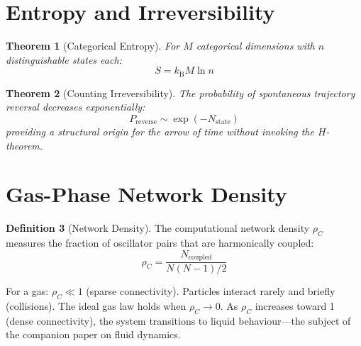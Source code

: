 \documentclass[twocolumn,10pt,a4paper]{article}
\theoremstyle{plain}
\newtheorem{theorem}{Theorem}[section]
\theoremstyle{definition}
\newtheorem{definition}[theorem]{Definition}
\theoremstyle{remark}
\newcommand{\kB}{k_{\mathrm{B}}}
\begin{document}
\section{Entropy and Irreversibility}
\label{sec:entropy}

\begin{theorem}[Categorical Entropy]
For $M$ categorical dimensions with $n$ distinguishable states each:
\begin{equation}
    S = \kB M \ln n
\end{equation}
\end{theorem}

\begin{theorem}[Counting Irreversibility]
The probability of spontaneous trajectory reversal decreases exponentially:
\begin{equation}
    P_{\mathrm{reverse}} \sim \exp(-N_{\mathrm{state}})
\end{equation}
providing a structural origin for the arrow of time without invoking the $H$-theorem.
\end{theorem}

\section{Gas-Phase Network Density}
\label{sec:network_density}

\begin{definition}[Network Density]
The computational network density $\rho_C$ measures the fraction of oscillator pairs that are harmonically coupled:
\begin{equation}
    \rho_C = \frac{N_{\mathrm{coupled}}}{N(N-1)/2}
\end{equation}
\end{definition}

For a gas: $\rho_C \ll 1$ (sparse connectivity). Particles interact rarely and briefly (collisions). The ideal gas law holds when $\rho_C \to 0$. As $\rho_C$ increases toward 1 (dense connectivity), the system transitions to liquid behaviour---the subject of the companion paper on fluid dynamics.
\end{document}
